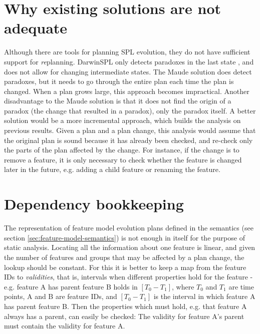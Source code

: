 \documentclass[a4paper,english]{ifimaster}
\begin{document}
\section{Why existing solutions are not adequate}%
\label{sec:why-existing-solutions-are-not-adequate}
Although there are tools for planning SPL evolution, they do not have sufficient support for \emph{re}planning. 
DarwinSPL %
only detects paradoxes in the 
last state %
, and does not allow for changing intermediate states. The 
Maude solution %
does detect paradoxes, 
but it needs to go through the entire plan each time the plan is changed. %
When a plan grows large, this approach becomes impractical. Another disadvantage to the Maude solution is that it does not find the origin of a paradox (the change that resulted in a paradox), only the paradox itself. A better solution would be a more incremental approach, which builds the analysis on previous results. Given a plan and a plan change, this analysis would assume that the original plan is sound because it has already been checked, and re-check only the parts of the plan affected by the change. For instance, if the change is to remove a feature, it is only necessary to check whether the feature is changed later in the future, e.g. adding a child feature or renaming the feature.  

\section{Dependency bookkeeping}%
\label{sec:dependency-bookkeeping}
The representation of feature model evolution plans defined in the semantics (see section \vref{sec:feature-model-semantics}) is 
not enough in itself for the purpose of static analysis. %
Locating all the information about one feature is linear, and given the number of features and groups that may be affected by a plan change, the lookup should be constant. For this it is better to keep a map from the feature IDs to \emph{validities}, that is, intervals when different properties hold for the feature - e.g. feature A has parent feature B holds in $[T_0 - T_1]$, where $T_0$ and $T_1$ are time points, A and B are feature IDs, and  $[T_0 - T_1]$ is the interval in which feature A has parent feature B. Then the properties which must hold, e.g. that feature A always has a parent, can easily be checked: The validity for feature A's parent must contain the validity for feature A. 
\end{document}
